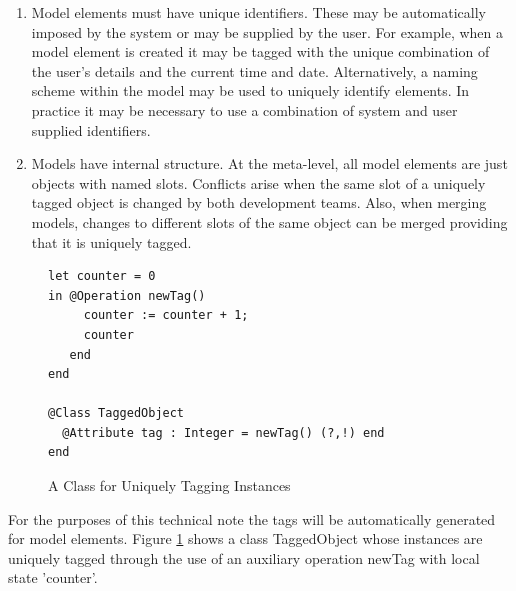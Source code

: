 \begin{enumerate}
\item Model elements must have unique identifiers. These may be automatically
imposed by the system or may be supplied by the user. For example,
when a model element is created it may be tagged with the unique combination
of the user's details and the current time and date. Alternatively,
a naming scheme within the model may be used to uniquely identify
elements. In practice it may be necessary to use a combination of
system and user supplied identifiers.
\item Models have internal structure. At the meta-level, all model elements
are just objects with named slots. Conflicts arise when the same slot
of a uniquely tagged object is changed by both development teams.
Also, when merging models, changes to different slots of the same
object can be merged providing that it is uniquely tagged.
\end{enumerate}
%
\begin{figure}
\hfill{}\begin{lstlisting}
let counter = 0
in @Operation newTag()
     counter := counter + 1;
     counter
   end
end
  
@Class TaggedObject 
  @Attribute tag : Integer = newTag() (?,!) end
end
\end{lstlisting}\hfill{}

\caption{A Class for Uniquely Tagging Instances\label{fig:A-Class-for}}

\end{figure}


For the purposes of this technical note the tags will be automatically
generated for model elements. Figure \ref{fig:A-Class-for} shows
a class TaggedObject whose instances are uniquely tagged through the
use of an auxiliary operation newTag with local state 'counter'.

